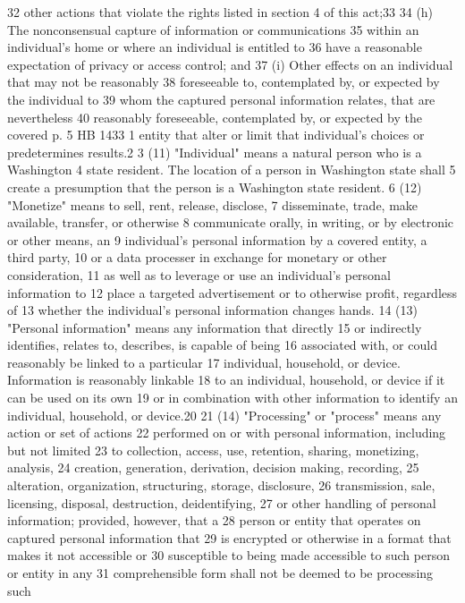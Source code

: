 32 other actions that violate the rights listed in section 4 of this
act;33
34 (h) The nonconsensual capture of information or communications
35 within an individual's home or where an individual is entitled to
36 have a reasonable expectation of privacy or access control; and
37 (i) Other effects on an individual that may not be reasonably
38 foreseeable to, contemplated by, or expected by the individual to
39 whom the captured personal information relates, that are nevertheless
40 reasonably foreseeable, contemplated by, or expected by the covered
p. 5 HB 1433
1 entity that alter or limit that individual's choices or predetermines
results.2
3 (11) "Individual" means a natural person who is a Washington
4 state resident. The location of a person in Washington state shall
5 create a presumption that the person is a Washington state resident.
6 (12) "Monetize" means to sell, rent, release, disclose,
7 disseminate, trade, make available, transfer, or otherwise
8 communicate orally, in writing, or by electronic or other means, an
9 individual's personal information by a covered entity, a third party,
10 or a data processer in exchange for monetary or other consideration,
11 as well as to leverage or use an individual's personal information to
12 place a targeted advertisement or to otherwise profit, regardless of
13 whether the individual's personal information changes hands.
14 (13) "Personal information" means any information that directly
15 or indirectly identifies, relates to, describes, is capable of being
16 associated with, or could reasonably be linked to a particular
17 individual, household, or device. Information is reasonably linkable
18 to an individual, household, or device if it can be used on its own
19 or in combination with other information to identify an individual,
household, or device.20
21 (14) "Processing" or "process" means any action or set of actions
22 performed on or with personal information, including but not limited
23 to collection, access, use, retention, sharing, monetizing, analysis,
24 creation, generation, derivation, decision making, recording,
25 alteration, organization, structuring, storage, disclosure,
26 transmission, sale, licensing, disposal, destruction, deidentifying,
27 or other handling of personal information; provided, however, that a
28 person or entity that operates on captured personal information that
29 is encrypted or otherwise in a format that makes it not accessible or
30 susceptible to being made accessible to such person or entity in any
31 comprehensible form shall not be deemed to be processing such
